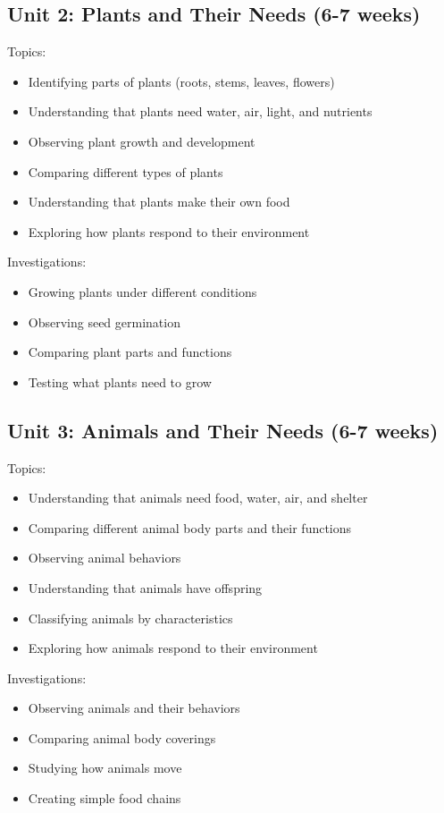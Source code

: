 \documentclass[11pt,letterpaper]{report}
\begin{document}
\subsection{Unit 2: Plants and Their Needs (6-7 weeks)}

Topics:
\begin{itemize}
\item Identifying parts of plants (roots, stems, leaves, flowers)
\item Understanding that plants need water, air, light, and nutrients
\item Observing plant growth and development
\item Comparing different types of plants
\item Understanding that plants make their own food
\item Exploring how plants respond to their environment
\end{itemize}

Investigations:
\begin{itemize}
\item Growing plants under different conditions
\item Observing seed germination
\item Comparing plant parts and functions
\item Testing what plants need to grow
\end{itemize}

\subsection{Unit 3: Animals and Their Needs (6-7 weeks)}

Topics:
\begin{itemize}
\item Understanding that animals need food, water, air, and shelter
\item Comparing different animal body parts and their functions
\item Observing animal behaviors
\item Understanding that animals have offspring
\item Classifying animals by characteristics
\item Exploring how animals respond to their environment
\end{itemize}

Investigations:
\begin{itemize}
\item Observing animals and their behaviors
\item Comparing animal body coverings
\item Studying how animals move
\item Creating simple food chains
\end{itemize}
\end{document}
